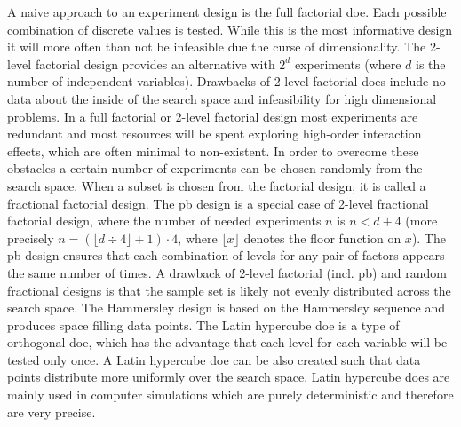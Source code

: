 A naive approach to an experiment design is the full factorial \gls{doe}.
Each possible combination of discrete values is tested. 
While this is the most informative design it will more often than not be infeasible due the curse of dimensionality\cite{cherkassky1998learning}.
The 2-level factorial design provides an alternative with $2^d$ experiments (where $d$ is the number of independent variables). 
Drawbacks of 2-level factorial \gls{doe}s include no data about the inside of the search space and infeasibility for high dimensional problems.
In a full factorial or 2-level factorial design most experiments are redundant and most resources will be spent exploring high-order interaction effects\cite{gunst2009fractional}, which are often minimal to non-existent.
In order to overcome these obstacles a certain number of experiments can be chosen randomly from the search space. 
When a subset is chosen from the factorial design, it is called a fractional factorial design. 
The \gls{pb}\cite{vanaja2007design,miller2001using,wang1995hidden} design is a special case of 2-level fractional factorial design, 
where the number of needed experiments $n$ is $n<d+4$ 
(more precisely $n=(\lfloor d\div4\rfloor+1)\cdot4$, where $\lfloor x\rfloor$ denotes the floor function on $x$).
The \gls{pb} design ensures that each combination of levels for any pair of factors appears the same number of times. 
A drawback of 2-level factorial (incl. \gls{pb}) and random fractional designs is that the sample set is likely not evenly distributed across the search space\cite{viana2016tutorial}. 
The Hammersley design\cite{viana2016tutorial,diwekar1997efficient} is based on the Hammersley sequence and produces space filling data points. 
The Latin hypercube \gls{doe}\cite{viana2016tutorial,diwekar1997efficient} is a type of orthogonal \gls{doe}, 
which has the advantage that each level for each variable will be tested only once. 
A Latin hypercube \gls{doe} can be also created such that data points distribute more uniformly over the search space. 
Latin hypercube \gls{doe}s are mainly used in computer simulations which are purely deterministic and therefore are very precise.
%
\iffalse
%

